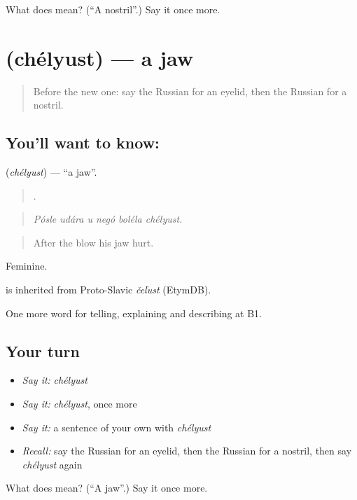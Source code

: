 \begin{tcolorbox}[breakable,colback=teal!4,colframe=teal!35!black,title={Before you move on}]
What does  mean? (\textquotedblleft{}A nostril\textquotedblright{}.) Say it once more.
\end{tcolorbox}
\section[\texorpdfstring{\ru{челюсть} (chélyust)}{челюсть (chélyust)}]{ (chélyust) — a jaw}

\label{lesson:RU-C482-chelyust}



\begin{quote}
Before the new one: say the Russian for an eyelid, then the Russian for a nostril.
\end{quote}

\subsection*{You'll want to know: }
\textbf{} (\emph{chélyust}) — \textquotedblleft{}a jaw\textquotedblright{}.

\begin{quote}
     .
\end{quote}

\begin{quote}
\emph{Pósle udára u negó boléla chélyust.}
\end{quote}

\begin{quote}
After the blow his jaw hurt.
\end{quote}

Feminine.

\begin{cousinweb}
\emph{} is inherited from Proto-Slavic \emph{čeľust} (EtymDB).
\end{cousinweb}

\begin{grammarlens}[title={What you've built}]
One more word for telling, explaining and describing at B1.
\end{grammarlens}

\subsection*{Your turn}
\begin{itemize}
\raggedright
  \item \emph{Say it:} \emph{chélyust}
  \item \emph{Say it:} \emph{chélyust}, once more
  \item \emph{Say it:} a sentence of your own with \emph{chélyust}
  \item \emph{Recall:} say the Russian for an eyelid, then the Russian for a nostril, then say \emph{chélyust} again
\end{itemize}

\begin{tcolorbox}[breakable,colback=teal!4,colframe=teal!35!black,title={Before you move on}]
What does  mean? (\textquotedblleft{}A jaw\textquotedblright{}.) Say it once more.
\end{tcolorbox}
